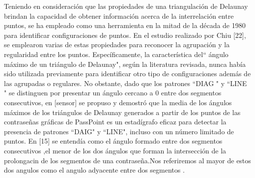 \documentclass[12pt]{report}
\begin{document}
	Teniendo en consideración que las propiedades de una triangulación de Delaunay brindan la capacidad de obtener información acerca de la interrelación entre puntos, se ha empleado como una herramienta en la mitad de la década de 1980 para identificar configuraciones de puntos. En el estudio realizado por Chiu [22], se emplearon varias de estas propiedades para reconocer la agrupación y la regularidad entre los puntos. Específicamente, la característica del`` ángulo máximo de un triángulo de Delaunay", según la literatura revisada, nunca había sido utilizada previamente para identificar otro tipo de configuraciones además de las agrupadas o regulares. No obstante, dado que los patrones ``DIAG " y ``LINE " se distinguen por presentar un ángulo cercano a 0{\degree } entre dos segmentos consecutivos, en [sensor] se propuso y demostró que la media de los ángulos máximos de los triángulos de Delaunay generados a partir de los puntos de las contraseñas gráficas de PassPoint es un estadígrafo eficaz para detectar la presencia de patrones ``DAIG" y ``LINE", incluso con un número limitado de puntos.
	En [15] se entendía como el ángulo formado entre dos segmentos consecutivos ,el menor de los dos ángulos que forman la intersección de la prolongacin de los segmentos de una contraseña.Nos referiremos al mayor de estos dos angulos como el angulo adyacente entre dos segmentos .

	

	
	
\end{document}
